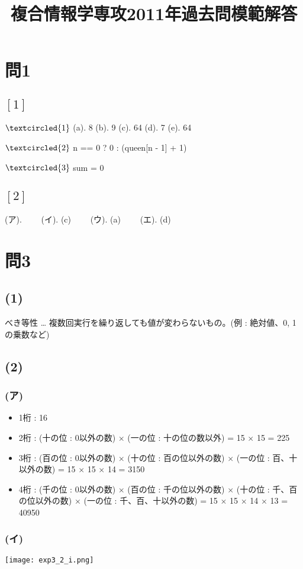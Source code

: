 \documentclass[10pt]{jarticle}
\title{複合情報学専攻2011年過去問模範解答}
\begin{document}
\section*{問1}
\subsection*{$[1]$}
$\textcircled{\scriptsize1}$ (a). 8 (b). 9 (c). 64  (d). 7 (e). 64

$\textcircled{\scriptsize2}$ n == 0 ? 0 : (queen[n - 1] + 1)

$\textcircled{\scriptsize3}$ sum = 0
\subsection*{$[2]$}
(ア). 　　(イ). (c) 　　(ウ). (a) 　　(エ). (d)

\section*{問3}
\subsection*{(1)}
べき等性 … 複数回実行を繰り返しても値が変わらないもの。(例 : 絶対値、0, 1の乗数など)\\
\subsection*{(2)}
\subsubsection*{(ア)}
 \begin{itemize}
 \item 1桁 : 16
 \item 2桁 : (十の位 : 0以外の数) $\times$ (一の位 : 十の位の数以外) = 15 $\times$ 15 = 225
 \item 3桁 : (百の位 : 0以外の数) $\times$ (十の位 : 百の位以外の数) $\times$ (一の位 : 百、十以外の数) = 15 $\times$ 15 $\times$ 14 = 3150
 \item 4桁 : (千の位 : 0以外の数) $\times$ (百の位 : 千の位以外の数) $\times$ (十の位 : 千、百の位以外の数) $\times$ (一の位 : 千、百、十以外の数) = 15 $\times$ 15 $\times$ 14 $\times$ 13 = 40950
 \end{itemize}
\subsubsection*{(イ)}
\texttt{[image: exp3\_2\_i.png]}\\
\end{document}
